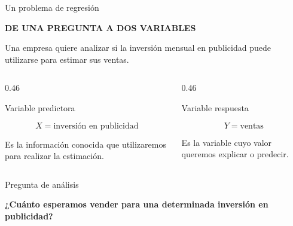 \documentclass[aspectratio=169,11pt]{beamer}
\newcommand{\kicker}[1]{%
  {\scriptsize\bfseries\color{cAcc}\MakeUppercase{#1}}%
  \par\vspace{0.2em}%
}
\newcommand{\pregunta}[1]{%
  {\color{cAcc}\bfseries #1}%
}
\newenvironment{cerrado}[1]
  {\begin{block}{#1}
   \begin{minipage}{\linewidth}
   \raggedright}
  {\end{minipage}
   \end{block}}
\begin{document}
\begin{frame}{Un problema de regresión}

  \begin{center}
    \begin{minipage}{0.90\textwidth}

      \kicker{DE UNA PREGUNTA A DOS VARIABLES}

      \vspace{0.4em}

      Una empresa quiere analizar si la inversión mensual en publicidad
      puede utilizarse para estimar sus ventas.

      \vspace{0.7em}

      \begin{columns}[T,onlytextwidth]

        \begin{column}{0.46\textwidth}

          \begin{cerrado}{Variable predictora}

            \[
              X=\text{inversión en publicidad}
            \]

            Es la información conocida que utilizaremos para realizar
            la estimación.

          \end{cerrado}

        \end{column}

        \begin{column}{0.46\textwidth}

          \begin{cerrado}{Variable respuesta}

            \[
              Y=\text{ventas}
            \]

            Es la variable cuyo valor queremos explicar o predecir.

          \end{cerrado}

        \end{column}

      \end{columns}

      \vspace{0.7em}

      \begin{cerrado}{Pregunta de análisis}

        \begin{center}
          \pregunta{¿Cuánto esperamos vender para una determinada
          inversión en publicidad?}
        \end{center}

      \end{cerrado}

    \end{minipage}
  \end{center}

\end{frame}
\end{document}
